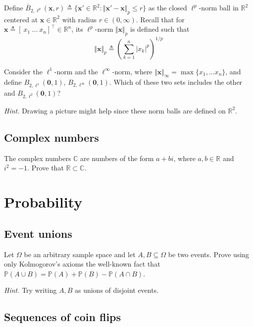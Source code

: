 \documentclass{article}
\numberwithin{equation}{section}
\begin{document}
Define $ \bar{B}_{2, \ell^p}(\mathbf{x}, r) \triangleq \{\mathbf{x}' \in
\mathbb{R}^2 : \Vert\mathbf{x}' - \mathbf{x}\Vert_p \le r\} $ as the closed
$ \ell^p $-norm ball in $ \mathbb{R}^2 $ centered at $ \mathbf{x}
\in \mathbb{R}^2 $ with radius $ r \in (0, \infty) $. Recall that for
$ \mathbf{x} \triangleq [ \ x_1 \ \ldots \ x_n ]^\top \in \mathbb{R}^n $, its
$ \ell^p $-norm $ \Vert\mathbf{x}\Vert_p $ is defined such that
\begin{equation*}
    \Vert\mathbf{x}\Vert_p \triangleq
    \left(\sum_{k = 1}^n|x_k|^p\right)^{1 / p}
\end{equation*}

Consider the $ \ell^1 $-norm and the $ \ell^\infty $-norm, where
$ \Vert\mathbf{x}\Vert_\infty = \max\{x_1, \ldots x_n\} $, and define
$ B_{2, \ell^1}(\mathbf{0}, 1) $, $ B_{2, \ell^\infty}(\mathbf{0}, 1) $.
Which of these two sets includes the other and
$ B_{2, \ell^2}(\mathbf{0}, 1) $?

\medskip

\textit{Hint.} Drawing a picture might help since these norm balls are
defined on $ \mathbb{R}^2 $.

\subsection{Complex numbers}

The complex numbers $ \mathbb{C} $ are numbers of the form $ a + bi $, where
$ a, b \in \mathbb{R} $ and $ i^2 = -1 $. Prove that
$ \mathbb{R} \subset \mathbb{C} $.

\section{Probability}

\subsection{Event unions}

Let $ \Omega $ be an arbitrary sample space and let $ A, B \subseteq \Omega $
be two events. Prove using only Kolmogorov's axioms the well-known fact that
$ \mathbb{P}(A \cup B) = \mathbb{P}(A) + \mathbb{P}(B) -
\mathbb{P}(A \cap B) $.

\medskip

\textit{Hint.} Try writing $ A, B $ as unions of disjoint events.

\subsection{Sequences of coin flips}
\end{document}
